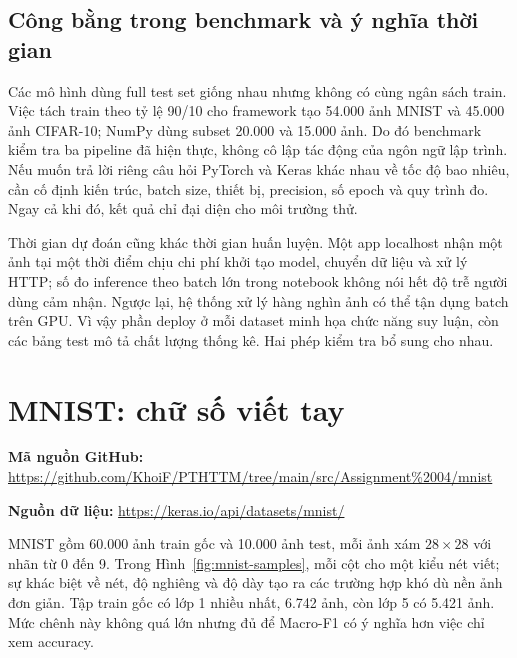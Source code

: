 \documentclass[12pt,a4paper]{report}
\newcommand{\datasetlink}[1]{\par\noindent\textbf{Nguồn dữ liệu: }\url{#1}\par}
\begin{document}
\subsection{Công bằng trong benchmark và ý nghĩa thời gian}
Các mô hình dùng full test set giống nhau nhưng không có cùng ngân sách train. Việc tách train theo tỷ lệ 90/10 cho framework tạo 54.000 ảnh MNIST và 45.000 ảnh CIFAR-10; NumPy dùng subset 20.000 và 15.000 ảnh. Do đó benchmark kiểm tra ba pipeline đã hiện thực, không cô lập tác động của ngôn ngữ lập trình. Nếu muốn trả lời riêng câu hỏi PyTorch và Keras khác nhau về tốc độ bao nhiêu, cần cố định kiến trúc, batch size, thiết bị, precision, số epoch và quy trình đo. Ngay cả khi đó, kết quả chỉ đại diện cho môi trường thử.

Thời gian dự đoán cũng khác thời gian huấn luyện. Một app localhost nhận một ảnh tại một thời điểm chịu chi phí khởi tạo model, chuyển dữ liệu và xử lý HTTP; số đo inference theo batch lớn trong notebook không nói hết độ trễ người dùng cảm nhận. Ngược lại, hệ thống xử lý hàng nghìn ảnh có thể tận dụng batch trên GPU. Vì vậy phần deploy ở mỗi dataset minh họa chức năng suy luận, còn các bảng test mô tả chất lượng thống kê. Hai phép kiểm tra bổ sung cho nhau.

\section{MNIST: chữ số viết tay}
\noindent\textbf{Mã nguồn GitHub: }\url{https://github.com/KhoiF/PTHTTM/tree/main/src/Assignment%2004/mnist}\par
\datasetlink{https://keras.io/api/datasets/mnist/}
MNIST gồm 60.000 ảnh train gốc và 10.000 ảnh test, mỗi ảnh xám $28\times28$ với nhãn từ 0 đến 9. Trong Hình~\ref{fig:mnist-samples}, mỗi cột cho một kiểu nét viết; sự khác biệt về nét, độ nghiêng và độ dày tạo ra các trường hợp khó dù nền ảnh đơn giản. Tập train gốc có lớp 1 nhiều nhất, 6.742 ảnh, còn lớp 5 có 5.421 ảnh. Mức chênh này không quá lớn nhưng đủ để Macro-F1 có ý nghĩa hơn việc chỉ xem accuracy.
\end{document}
